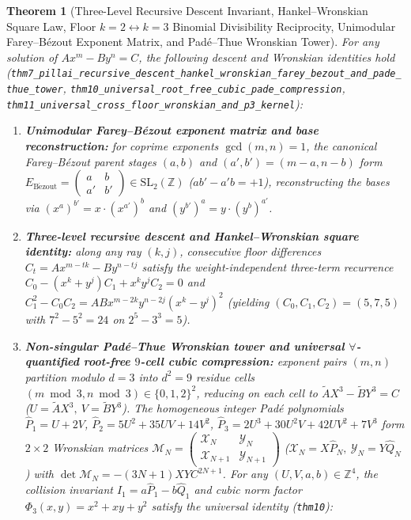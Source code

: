 \documentclass[11pt,a4paper]{article}
\theoremstyle{plain}
\newtheorem{theorem}{Theorem}[section]
\theoremstyle{definition}
\begin{document}
\begin{theorem}[Three-Level Recursive Descent Invariant, Hankel--Wronskian Square Law, Floor $k=2\leftrightarrow k=3$ Binomial Divisibility Reciprocity, Unimodular Farey--B\'ezout Exponent Matrix, and Pad\'e--Thue Wronskian Tower]
\label{thm:main-7}
For any solution of $A x^m - B y^n = C$, the following descent and Wronskian identities hold (\texttt{thm7\_pillai\_recursive\_descent\_hankel\_wronskian\_farey\_bezout\_and\_pade\_thue\_tower}, \texttt{thm10\_universal\_root\_free\_cubic\_pade\_compression}, \texttt{thm11\_universal\_cross\_floor\_wronskian\_and\_p3\_kernel}):
\begin{enumerate}[label=\textbf{(\roman*)},leftmargin=*]
\item \textbf{Unimodular Farey--B\'ezout exponent matrix and base reconstruction:}
  for coprime exponents $\gcd(m,n)=1$, the canonical Farey--B\'ezout parent stages $(a,b)$ and $(a',b') = (m-a,n-b)$ form $E_{\mathrm{B\acute{e}zout}} = \begin{pmatrix} a & b \\ a' & b' \end{pmatrix}\in\mathrm{SL}_2(\mathbb{Z})$ ($a b' - a' b = +1$), reconstructing the bases via $(x^a)^{b'} = x\cdot (x^{a'})^b$ and $(y^{b'})^a = y\cdot (y^b)^{a'}$.
\item \textbf{Three-level recursive descent and Hankel--Wronskian square identity:}
  along any ray $(k,j)$, consecutive floor differences $C_t = A x^{m-tk} - B y^{n-tj}$ satisfy the weight-independent three-term recurrence $C_0 - (x^k+y^j)C_1 + x^k y^j C_2 = 0$ and $C_1^2 - C_0 C_2 = A B x^{m-2k}y^{n-2j}(x^k-y^j)^2$ (yielding $(C_0,C_1,C_2) = (5,7,5)$ with $7^2 - 5^2 = 24$ on $2^5 - 3^3 = 5$).
\item \textbf{Non-singular Pad\'e--Thue Wronskian tower and universal $\forall$-quantified root-free $9$-cell cubic compression:}
  exponent pairs $(m,n)$ partition modulo $d=3$ into $d^2=9$ residue cells $(m\bmod 3,n\bmod 3)\in\{0,1,2\}^2$, reducing on each cell to $\widetilde{A} X^3 - \widetilde{B} Y^3 = C$ ($U = \widetilde{A} X^3,\ V = \widetilde{B} Y^3$). The homogeneous integer Pad\'e polynomials $\widehat{P}_1 = U + 2V$, $\widehat{P}_2 = 5U^2 + 35UV + 14V^2$, $\widehat{P}_3 = 2U^3 + 30U^2V + 42UV^2 + 7V^3$ form $2\times 2$ Wronskian matrices $\mathcal{M}_N = \begin{pmatrix} \mathcal{X}_N & \mathcal{Y}_N \\ \mathcal{X}_{N+1} & \mathcal{Y}_{N+1} \end{pmatrix}$ ($\mathcal{X}_N = X\widehat{P}_N,\ \mathcal{Y}_N = Y\widehat{Q}_N$) with $\det\mathcal{M}_N = -(3N+1) X Y C^{2N+1}$. For any $(U,V,a,b)\in\mathbb{Z}^4$, the collision invariant $I_1 = a\widehat{P}_1 - b\widehat{Q}_1$ and cubic norm factor $\Phi_3(x,y) = x^2 + xy + y^2$ satisfy the universal identity (\texttt{thm10}):

\end{enumerate}
\end{theorem}
\end{document}
